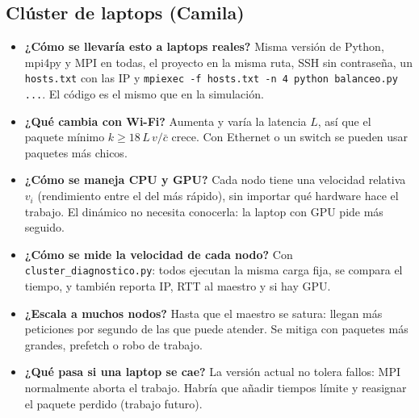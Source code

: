 \documentclass[11pt,a4paper]{article}
\begin{document}
\subsection*{Clúster de laptops (Camila)}
\begin{itemize}
  \item \textbf{¿Cómo se llevaría esto a laptops reales?} Misma versión de Python, mpi4py y MPI en todas, el proyecto en la misma ruta, SSH sin contraseña, un \texttt{hosts.txt} con las IP y \texttt{mpiexec -f hosts.txt -n 4 python balanceo.py ...}. El código es el mismo que en la simulación.
  \item \textbf{¿Qué cambia con Wi-Fi?} Aumenta y varía la latencia $L$, así que el paquete mínimo $k\ge 18\,L\,v/\bar c$ crece. Con Ethernet o un switch se pueden usar paquetes más chicos.
  \item \textbf{¿Cómo se maneja CPU y GPU?} Cada nodo tiene una velocidad relativa $v_i$ (rendimiento entre el del más rápido), sin importar qué hardware hace el trabajo. El dinámico no necesita conocerla: la laptop con GPU pide más seguido.
  \item \textbf{¿Cómo se mide la velocidad de cada nodo?} Con \texttt{cluster\_diagnostico.py}: todos ejecutan la misma carga fija, se compara el tiempo, y también reporta IP, RTT al maestro y si hay GPU.
  \item \textbf{¿Escala a muchos nodos?} Hasta que el maestro se satura: llegan más peticiones por segundo de las que puede atender. Se mitiga con paquetes más grandes, prefetch o robo de trabajo.
  \item \textbf{¿Qué pasa si una laptop se cae?} La versión actual no tolera fallos: MPI normalmente aborta el trabajo. Habría que añadir tiempos límite y reasignar el paquete perdido (trabajo futuro).
\end{itemize}
\end{document}
